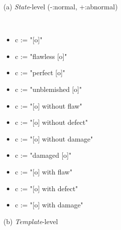 \begin{figure}
\noindent\begin{minipage}[t]{0.32\linewidth}
(a) \emph{State}-level (-:normal, +:abnormal)

{\tt \small
\begin{itemize}
    \item[-] c := "[o]"
    \item[-] c := "flawless [o]"
    \item[-] c := "perfect [o]"
    \item[-] c := "unblemished [o]"
    \item[-] c := "[o] without flaw"
    \item[-] c := "[o] without defect"
    \item[-] c := "[o] without damage"
    \item[+] c := "damaged [o]"
    \item[+] c := "[o] with flaw"
    \item[+] c := "[o] with defect"
    \item[+] c := "[o] with damage"
\end{itemize}
}
\end{minipage}
\hfill
\begin{minipage}[t]{0.38\linewidth}
(b) \emph{Template}-level


\end{minipage}
\end{figure}
